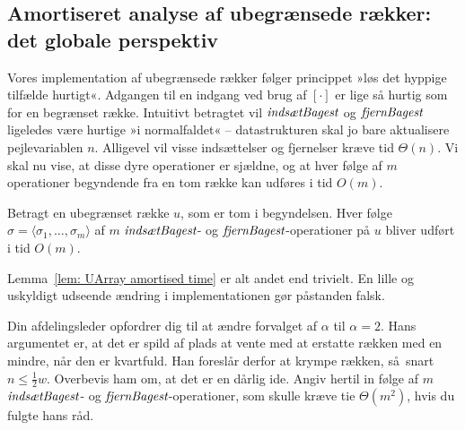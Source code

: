 \subsection{Amortiseret analyse af ubegrænsede rækker: det globale perspektiv}

Vores implementation af ubegrænsede rækker følger princippet »løs det hyppige tilfælde hurtigt«.
Adgangen til en indgang ved brug af $[\cdot]$ er lige så hurtig som for en begrænset række.
Intuitivt betragtet vil $\operatorname{\emph{indsætBagest}}$ og $\operatorname{\emph{fjernBagest}}$ ligeledes være hurtige »i normalfaldet« -- datastrukturen skal jo bare aktualisere pejlevariablen $n$.
Alligevel vil visse indsættelser og fjernelser kræve tid $\Theta(n)$.
Vi skal nu vise, at disse dyre operationer er sjældne, og at hver følge af $m$ operationer begyndende fra en tom række kan udføres i tid $O(m)$.

\begin{lem}
  \label{lem: UArray amortised time}
  Betragt en ubegrænset række $u$, som er tom i begyndelsen.
  Hver følge $\sigma=\langle \sigma_1,\ldots,\sigma_m\rangle$ af $m$ $\operatorname{\emph{indsætBagest}}$- og $\operatorname{\emph{fjernBagest}}$-operationer på $u$ bliver udført i tid $O(m)$.
\end{lem}

Lemma~\ref{lem: UArray amortised time} er alt andet end trivielt.
En lille og uskyldigt udseende ændring i implementationen gør påstanden falsk.

\begin{exerc}
  Din afdelingsleder opfordrer dig til at ændre forvalget af $\alpha$ til $\alpha=2$.
  Hans argumentet er, at det er spild af plads at vente med at erstatte rækken med en mindre, når den er kvartfuld.
  Han foreslår derfor at krympe rækken, så snart $n\leq \frac{1}{2}w$.
  Overbevis ham om, at det er en dårlig ide.
  Angiv hertil in følge af $m$ $\operatorname{\emph{indsætBagest}}$- og $\operatorname{\emph{fjernBagest}}$-operationer, som skulle kræve tie $\Theta(m^2)$, hvis du fulgte hans råd.
\end{exerc}

